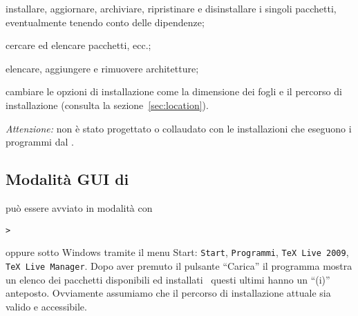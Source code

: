 \documentclass{article}
\begin{document}
\begin{itemize*}
\item installare, aggiornare, archiviare, ripristinare e disinstallare i
  singoli pacchetti, eventualmente tenendo conto delle dipendenze;
\item cercare ed elencare pacchetti, ecc.;
\item elencare, aggiungere e rimuovere architetture;
\item cambiare le opzioni di installazione come la dimensione dei fogli e
  il percorso di installazione (consulta la sezione~\ref{sec:location}).
\end{itemize*}
\textit{Attenzione:}  non è stato progettato o collaudato con
le installazioni che eseguono i programmi dal \DVD.

\subsection{Modalità GUI di }
 può essere avviato in modalità \GUI{} con
\begin{alltt}
> 
\end{alltt}
oppure sotto Windows tramite il menu Start: \texttt{Start},
\texttt{Programmi}, \texttt{TeX Live 2009}, \texttt{TeX Live Manager}.
Dopo aver premuto il pulsante ``Carica'' il programma mostra un elenco dei
pacchetti disponibili ed installati \Dash\ questi ultimi hanno un ``(i)''
anteposto. Ovviamente assumiamo che il percorso di installazione attuale
sia valido e accessibile.
\end{document}
